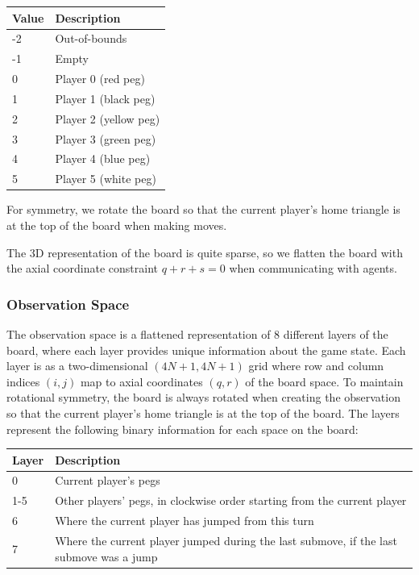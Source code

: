 \documentclass[12pt, a4paper, twocolumn]{article}
\begin{document}
\begin{center}
  \begin{tabular}{|m{}|m{}|}
    \hline
    Value & Description \\
    \hline
    -2 & Out-of-bounds \\
    -1 & Empty \\
    0 & Player 0 (red peg) \\
    1 & Player 1 (black peg) \\
    2 & Player 2 (yellow peg) \\
    3 & Player 3 (green peg) \\
    4 & Player 4 (blue peg) \\
    5 & Player 5 (white peg) \\
    \hline
  \end{tabular}
  \end{center}

For symmetry, we rotate the board so that the current player's home triangle is at the top of the board when making moves. 
  
The 3D representation of the board is quite sparse, so we flatten the board with the axial coordinate constraint $q + r + s = 0$ when communicating with agents.

\subsubsection{Observation Space}

The observation space is a flattened representation of 8 different layers of the board, where each layer provides unique information about the game state. Each layer is as a two-dimensional $(4N + 1, 4N + 1)$ grid where row and column indices $(i, j)$ map to axial coordinates $(q, r)$ of the board space. To maintain rotational symmetry, the board is always rotated when creating the observation so that the current player's home triangle is at the top of the board. The layers represent the following binary information for each space on the board:

\begin{center}
\begin{tabular}{|m{}|m{}|}
  \hline
  Layer & Description \\
  \hline
  0 & Current player's pegs \\
  1-5 & Other players' pegs, in clockwise order starting from the current player \\
  6 & Where the current player has jumped from this turn \\
  7 & Where the current player jumped during the last submove, if the last submove was a jump \\
  \hline
\end{tabular}
\end{center}
\end{document}
